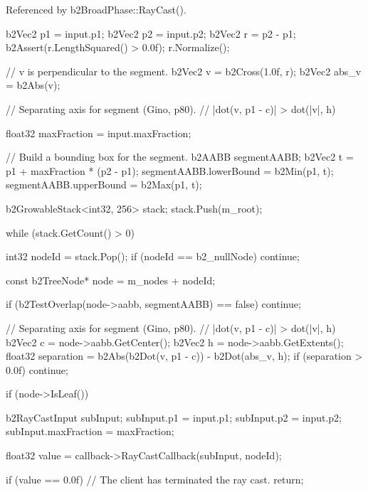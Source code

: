 Referenced by b2\-Broad\-Phase\-::\-Ray\-Cast().


\begin{DoxyCode}
{
        b2Vec2 p1 = input.p1;
        b2Vec2 p2 = input.p2;
        b2Vec2 r = p2 - p1;
        b2Assert(r.LengthSquared() > 0.0f);
        r.Normalize();

        // v is perpendicular to the segment.
        b2Vec2 v = b2Cross(1.0f, r);
        b2Vec2 abs_v = b2Abs(v);

        // Separating axis for segment (Gino, p80).
        // |dot(v, p1 - c)| > dot(|v|, h)

        float32 maxFraction = input.maxFraction;

        // Build a bounding box for the segment.
        b2AABB segmentAABB;
        {
                b2Vec2 t = p1 + maxFraction * (p2 - p1);
                segmentAABB.lowerBound = b2Min(p1, t);
                segmentAABB.upperBound = b2Max(p1, t);
        }

        b2GrowableStack<int32, 256> stack;
        stack.Push(m_root);

        while (stack.GetCount() > 0)
        {
                int32 nodeId = stack.Pop();
                if (nodeId == b2_nullNode)
                {
                        continue;
                }

                const b2TreeNode* node = m_nodes + nodeId;

                if (b2TestOverlap(node->aabb, segmentAABB) == false)
                {
                        continue;
                }

                // Separating axis for segment (Gino, p80).
                // |dot(v, p1 - c)| > dot(|v|, h)
                b2Vec2 c = node->aabb.GetCenter();
                b2Vec2 h = node->aabb.GetExtents();
                float32 separation = b2Abs(b2Dot(v, p1 - c)) - b2Dot(abs_v, h);
                if (separation > 0.0f)
                {
                        continue;
                }

                if (node->IsLeaf())
                {
                        b2RayCastInput subInput;
                        subInput.p1 = input.p1;
                        subInput.p2 = input.p2;
                        subInput.maxFraction = maxFraction;

                        float32 value = callback->RayCastCallback(subInput, 
      nodeId);

                        if (value == 0.0f)
                        {
                                // The client has terminated the ray cast.
                                return;
                        }

}}}
\end{DoxyCode}
